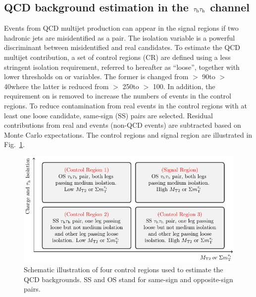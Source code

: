 \subsection{\texorpdfstring{QCD background estimation in the $\tau_{\rm h}\tau_{\rm h}$ channel}{QCD background estimation in the tau-tau channel}}
\label{sect:bkgQCD}
Events from QCD multijet production can appear in the signal regions if two hadronic jets are misidentified as a \tauTau pair.
The isolation variable is a powerful discriminant between misidentified and real \Tau candidates. To estimate the QCD multijet contribution, a set of \tauTau control regions (CR) are defined using a less stringent \Tau isolation requirement, referred to hereafter as ``loose'', together with lower thresholds on \mttwo or \SumMT variables. The former is changed from \mttwo $>$ 90\GeV to \mttwo $>$ 40\GeV where the latter is reduced from \SumMT $>$ 250\GeV to \SumMT $>$ 100\GeV. In addition, the requirement on \deltaphi is removed to increase the numbers of events in the control regions. 
To reduce contamination from real \tauTau events 
in the control regions with at least one loose \Tau candidate, 
same-sign (SS) \tauTau pairs are selected. Residual contributions from real 
\tauTau and \wjets events (non-QCD events) are subtracted based on Monte Carlo expectations. 
The control regions and signal region are illustrated in Fig.~\ref{fig:ABCDQCD}. 
\begin{figure}[!htb]
\centering
\includegraphics[angle=0,scale=1.15]{Bkg/ABCD.pdf}
\caption{Schematic illustration of four control regions used to estimate the QCD backgrounds. SS and OS stand for same-sign and opposite-sign pairs.}
\label{fig:ABCDQCD}
\end{figure}
